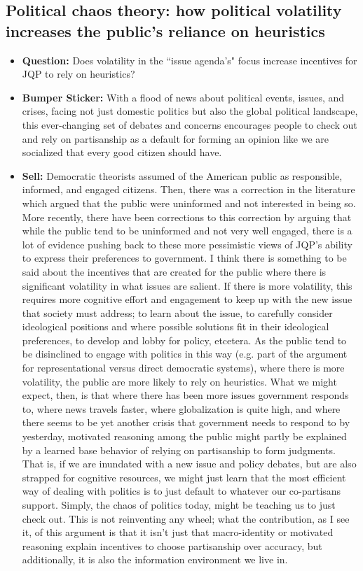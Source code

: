 \documentclass[12pt]{article}
\begin{document}
\subsection{Political chaos theory: how political volatility increases the public's reliance on heuristics}
    \begin{itemize}
        \item \textbf{Question:} Does volatility in the ``issue agenda's" focus increase incentives for JQP to rely on heuristics?
        \item \textbf{Bumper Sticker:} With a flood of news about political events, issues, and crises, facing not just domestic politics but also the global political landscape, this ever-changing set of debates and concerns encourages people to check out and rely on partisanship as a default for forming an opinion like we are socialized that every good citizen should have.
        \item \textbf{Sell:} Democratic theorists assumed of the American public as responsible, informed, and engaged citizens. Then, there was a correction in the literature which argued that the public were uninformed and not interested in being so. More recently, there have been corrections to this correction by arguing that while the public tend to be uninformed and not very well engaged, there is a lot of evidence pushing back to these more pessimistic views of JQP's ability to express their preferences to government. I think there is something to be said about the incentives that are created for the public where there is significant volatility in what issues are salient. If there is more volatility, this requires more cognitive effort and engagement to keep up with the new issue that society must address; to learn about the issue, to carefully consider ideological positions and where possible solutions fit in their ideological preferences, to develop and lobby for policy, etcetera. As the public tend to be disinclined to engage with politics in this way (e.g. part of the argument for representational versus direct democratic systems), where there is more volatility, the public are more likely to rely on heuristics. What we might expect, then, is that where there has been more issues government responds to, where news travels faster, where globalization is quite high, and where there seems to be yet another crisis that government needs to respond to by yesterday, motivated reasoning among the public might partly be explained by a learned base behavior of relying on partisanship to form judgments. That is, if we are inundated with a new issue and policy debates, but are also strapped for cognitive resources, we might just learn that the most efficient way of dealing with politics is to just default to whatever our co-partisans support. Simply, the chaos of politics today, might be teaching us to just check out. This is not reinventing any wheel; what the contribution, as I see it, of this argument is that it isn't just that macro-identity or motivated reasoning explain incentives to choose partisanship over accuracy, but additionally, it is also the information environment we live in. 

\end{itemize}
\end{document}
